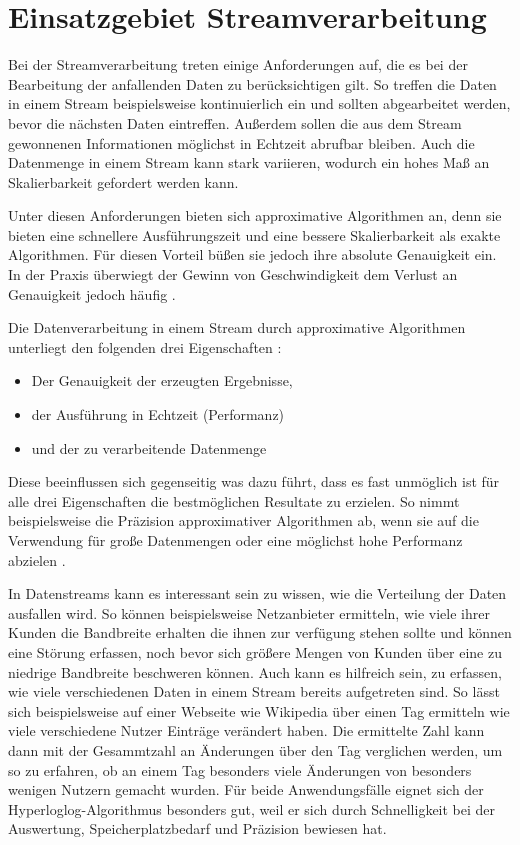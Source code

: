 \section{Einsatzgebiet Streamverarbeitung}
Bei der Streamverarbeitung treten einige Anforderungen auf, 
die es bei der Bearbeitung der anfallenden Daten zu berücksichtigen gilt. 
So treffen die Daten in einem Stream beispielsweise kontinuierlich ein 
und sollten abgearbeitet werden, bevor die nächsten Daten eintreffen. 
Außerdem sollen die aus dem Stream gewonnenen Informationen möglichst in Echtzeit abrufbar bleiben.
Auch die Datenmenge in einem Stream kann stark variieren, wodurch ein hohes Maß an Skalierbarkeit gefordert werden kann.

Unter diesen Anforderungen bieten sich approximative Algorithmen an, denn sie bieten eine schnellere Ausführungszeit und eine bessere Skalierbarkeit als exakte Algorithmen. 
Für diesen Vorteil büßen sie jedoch ihre absolute Genauigkeit ein. 
In der Praxis überwiegt der Gewinn von Geschwindigkeit dem Verlust an Genauigkeit jedoch häufig \cite{maas2019}. 

Die Datenverarbeitung in einem Stream durch approximative Algorithmen unterliegt den folgenden drei Eigenschaften \cite{maas2019}:  


\begin{itemize}
\item
Der Genauigkeit der erzeugten Ergebnisse,
\item
der Ausführung in Echtzeit (Performanz)
\item
und der zu verarbeitende Datenmenge
\end{itemize}

Diese beeinflussen sich gegenseitig was dazu führt, 
dass es fast unmöglich ist für alle drei Eigenschaften die bestmöglichen Resultate zu erzielen.
So nimmt beispielsweise die Präzision approximativer Algorithmen ab, 
wenn sie auf die Verwendung für große Datenmengen oder eine möglichst hohe Performanz abzielen \cite{maas2019}.

In Datenstreams kann es interessant sein zu wissen, 
wie die Verteilung der Daten ausfallen wird. 
So können beispielsweise Netzanbieter ermitteln, 
wie viele ihrer Kunden die Bandbreite erhalten die ihnen zur verfügung stehen sollte 
und können eine Störung erfassen, 
noch bevor sich größere Mengen von Kunden über eine zu niedrige Bandbreite beschweren können.
Auch kann es hilfreich sein, zu erfassen, 
wie viele verschiedenen Daten in einem Stream bereits aufgetreten sind. 
So lässt sich beispielsweise auf einer Webseite wie Wikipedia über einen Tag ermitteln wie viele verschiedene Nutzer Einträge verändert haben. 
Die ermittelte Zahl kann dann mit der Gesammtzahl an Änderungen über den Tag verglichen werden, 
um so zu erfahren, ob an einem Tag besonders viele Änderungen von besonders wenigen Nutzern gemacht wurden.
Für beide Anwendungsfälle eignet sich der Hyperloglog-Algorithmus besonders gut, 
weil er sich durch Schnelligkeit bei der Auswertung, 
Speicherplatzbedarf und Präzision bewiesen hat.